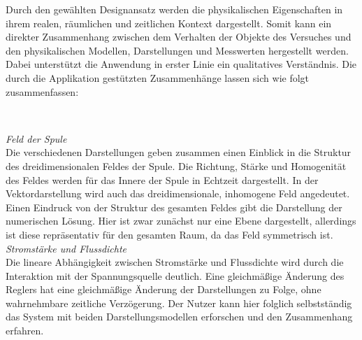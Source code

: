 Durch den gewählten Designansatz werden die physikalischen Eigenschaften in ihrem realen, räumlichen und zeitlichen Kontext dargestellt. Somit kann ein direkter Zusammenhang zwischen dem Verhalten der Objekte des Versuches und den physikalischen Modellen, Darstellungen und Messwerten hergestellt werden. Dabei unterstützt die Anwendung in erster Linie ein qualitatives Verständnis. Die durch die Applikation gestützten Zusammenhänge lassen sich wie folgt zusammenfassen:

\vspace{8px}
\begin{center}
	\\
\end{center}
\vspace{6px}

\textit{Feld der Spule}\\
Die verschiedenen Darstellungen geben zusammen einen Einblick in die Struktur des dreidimensionalen Feldes der Spule. Die Richtung, Stärke und Homogenität des Feldes werden für das Innere der Spule in Echtzeit dargestellt. In der Vektordarstellung wird auch das dreidimensionale, inhomogene Feld angedeutet. Einen Eindruck von der Struktur des gesamten Feldes gibt die Darstellung der numerischen Lösung. Hier ist zwar zunächst nur eine Ebene dargestellt, allerdings ist diese repräsentativ für den gesamten Raum, da das Feld symmetrisch ist.\\

\textit{Stromstärke und Flussdichte}\\
Die lineare Abhängigkeit zwischen Stromstärke und Flussdichte wird durch die Interaktion mit der Spannungsquelle deutlich. Eine gleichmäßige Änderung des Reglers hat eine gleichmäßige Änderung der Darstellungen zu Folge, ohne wahrnehmbare zeitliche Verzögerung. Der Nutzer kann hier folglich selbstständig das System mit beiden Darstellungsmodellen erforschen und den Zusammenhang erfahren.\\

